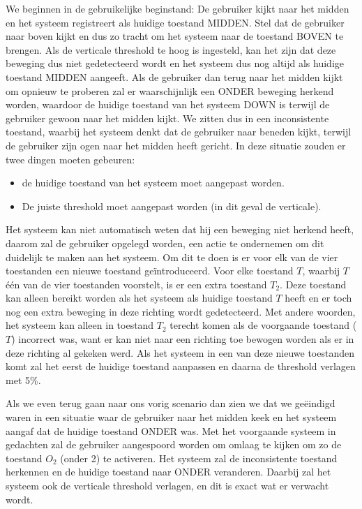 \documentclass{article}
\begin{document}
We beginnen in de gebruikelijke beginstand: De gebruiker kijkt naar het midden en het systeem registreert als huidige toestand MIDDEN. Stel dat de gebruiker naar boven kijkt en dus zo tracht om het systeem naar de toestand BOVEN te brengen. Als de verticale threshold te hoog is ingesteld, kan het zijn dat deze beweging dus niet gedetecteerd wordt en het systeem dus nog altijd als huidige toestand MIDDEN aangeeft. Als de gebruiker dan terug naar het midden kijkt om opnieuw te proberen zal er waarschijnlijk een ONDER beweging herkend worden, waardoor de huidige toestand van het systeem DOWN is terwijl de gebruiker gewoon naar het midden kijkt. We zitten dus in een inconsistente toestand, waarbij het systeem denkt dat de gebruiker naar beneden kijkt, terwijl de gebruiker zijn ogen naar het midden heeft gericht. In deze situatie zouden er twee dingen moeten gebeuren:
\begin{itemize}
	\item de huidige toestand van het systeem moet aangepast worden.
	\item De juiste threshold moet aangepast worden (in dit geval de verticale).
\end{itemize}

Het systeem kan niet automatisch weten dat hij een beweging niet herkend heeft, daarom zal de gebruiker opgelegd worden, een actie te ondernemen om dit duidelijk te maken aan het systeem. Om dit te doen is er voor elk van de vier toestanden een nieuwe toestand geïntroduceerd. Voor elke toestand $T$, waarbij $T$ \'e\'en van de vier toestanden voorstelt, is er een extra toestand $T_2$. Deze toestand kan alleen bereikt worden als het systeem als huidige toestand $T$ heeft en er toch nog een extra beweging in deze richting wordt gedetecteerd.  Met andere woorden, het systeem kan alleen in toestand $T_2$ terecht komen als de voorgaande toestand ($T$) incorrect was, want er kan niet naar een richting toe bewogen worden als er in deze richting al gekeken werd. Als het systeem in een van deze nieuwe toestanden komt zal het eerst de huidige toestand aanpassen en daarna de threshold verlagen met 5\%.

Als we even terug gaan naar ons vorig scenario dan zien we dat we geëindigd waren in een situatie waar de gebruiker naar het midden keek en het systeem aangaf dat de huidige toestand ONDER was. Met het voorgaande systeem in gedachten zal de gebruiker aangespoord worden om omlaag te kijken om zo de toestand $O_2$ (onder 2) te activeren. Het systeem zal de inconsistente toestand herkennen en de huidige toestand naar ONDER veranderen. Daarbij zal het systeem ook de verticale threshold verlagen, en dit is exact wat er verwacht wordt.
\end{document}

